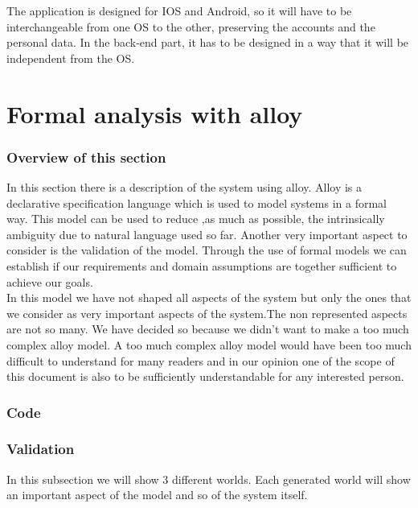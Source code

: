 \documentclass[titlepage]{article}
\begin{document}
The application is designed for IOS and Android, so it will have to be interchangeable from one OS to the other, preserving the accounts and the personal data.
In the back-end part, it has to be designed in a way that it will be independent from the OS.


\section{Formal analysis with alloy}
\subsubsection{Overview of this section}
In this section there is a description of the system using alloy. Alloy is a declarative specification language which is used to model systems in a formal way. This model can be used to reduce ,as much as possible, the intrinsically ambiguity due to natural language used so far.
Another very important aspect to consider is the validation of the model. Through the use of formal models we can establish if our requirements and domain assumptions are together sufficient to achieve our goals.\\
In this model we have not shaped all aspects of the system but only the ones that we consider as very important aspects of the system.The non represented aspects are not so many. We have decided so because we didn't want to make a too much complex alloy model. A too much complex alloy model would have been too much difficult to understand for many readers and in our opinion one of the scope of this document is also to be sufficiently understandable for any interested person.

\subsubsection{Code}

\subsubsection{Validation}
In this subsection we will show 3 different worlds. Each generated world will show an important aspect of the model and so of the system itself.
\end{document}
